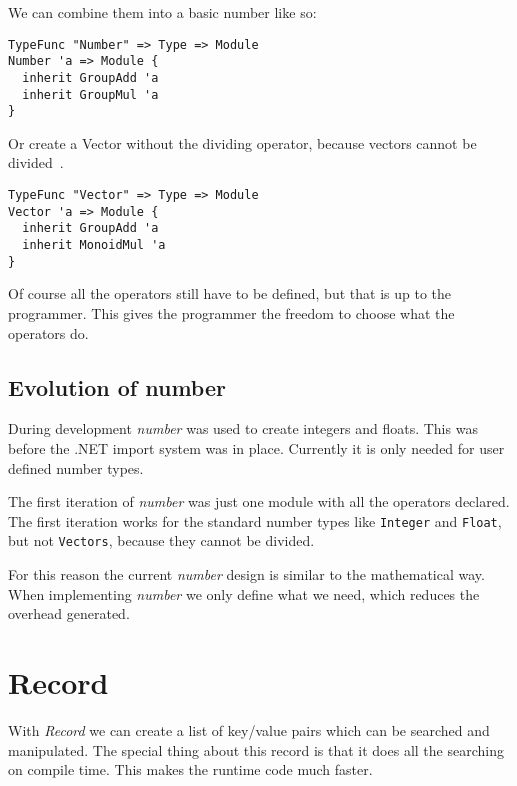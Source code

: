 We can combine them into a basic number like so:

\begin{lstlisting}
TypeFunc "Number" => Type => Module
Number 'a => Module {
  inherit GroupAdd 'a
  inherit GroupMul 'a
}
\end{lstlisting}

Or create a Vector without the dividing operator, because vectors cannot be divided~\cite{hazewinkel2013encyclopaedia}.

\begin{lstlisting}
TypeFunc "Vector" => Type => Module
Vector 'a => Module {
  inherit GroupAdd 'a
  inherit MonoidMul 'a
}
\end{lstlisting}

Of course all the operators still have to be defined, but that is up to the programmer.
This gives the programmer the freedom to choose what the operators do.


\subsection{Evolution of number}
During development \emph{number} was used to create integers and floats.
This was before the .NET import system was in place.
Currently it is only needed for user defined number types.

The first iteration of \emph{number} was just one module with all the operators declared.
The first iteration works for the standard number types like \texttt{Integer} and \texttt{Float}, but not \texttt{Vectors}, because they cannot be divided.

For this reason the current \emph{number} design is similar to the mathematical way.
When implementing \emph{number} we only define what we need, which reduces the overhead generated.


\section{Record}\label{sec:standardrecord}
With \emph{Record} we can create a list of key/value pairs which can be searched and manipulated.
The special thing about this record is that it does all the searching on compile time.
This makes the runtime code much faster.



